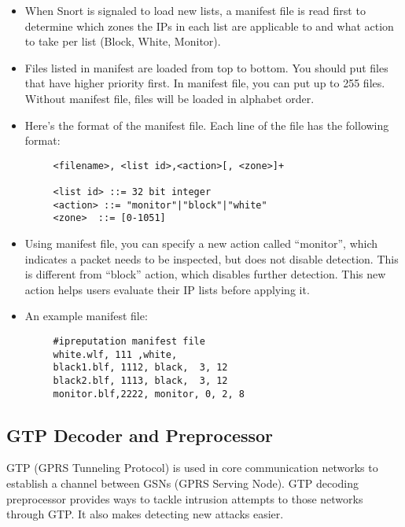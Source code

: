 \documentclass[english]{report}
\begin{document}
\begin{itemize}
\begin{itemize}
 \item[]   When Snort is signaled to load new lists, a manifest file is read first to 
   determine which zones the IPs in each list are applicable to and what action 
   to take per list (Block, White, Monitor). \\
   
 \item[]   Files listed in manifest are loaded from top to bottom. You should put files 
   that have higher priority first. In manifest file, you can put up to 255 
   files. Without manifest file, files will be loaded in alphabet order.\\
   
 \item[]   Here's the format of the manifest file. Each line of the file has the 
   following format:\\
    \begin{verbatim} 
     <filename>, <list id>,<action>[, <zone>]+
  
     <list id> ::= 32 bit integer
     <action> ::= "monitor"|"block"|"white"
     <zone>  ::= [0-1051]
    \end{verbatim}

 \item[]   Using manifest file, you can specify a new action called ``monitor'', which
   indicates a packet needs to be inspected, but does not disable detection. This is
   different from ``block'' action, which disables further detection. This new
   action helps users evaluate their IP lists before applying it.
 \item[] An example manifest file:
    \begin{verbatim} 
     #ipreputation manifest file
     white.wlf, 111 ,white, 
     black1.blf, 1112, black,  3, 12
     black2.blf, 1113, black,  3, 12
     monitor.blf,2222, monitor, 0, 2, 8
    \end{verbatim}
\end{itemize}
\end{itemize}
\subsection{GTP Decoder and Preprocessor}
\label{sub:gtp}
GTP (GPRS Tunneling Protocol) is used in core communication networks to establish
a channel between GSNs (GPRS Serving Node). GTP decoding preprocessor provides
ways to tackle intrusion attempts to those networks through GTP. It also makes 
detecting new attacks easier.
\end{document}

